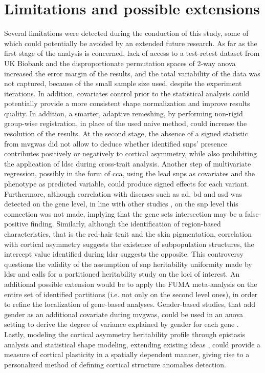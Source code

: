 \section{Limitations and possible extensions}
Several limitations were detected during the conduction of this study, some of which could potentially be avoided by an extended future research. As far as the first stage of the analysis is concerned, lack of access to a test-retest dataset from UK Biobank and the disproportionate permutation spaces of 2-way \ac{anova} increased the error margin of the results, and the total variability of the data was not captured, because of the small sample size used, despite the experiment iterations. In addition, covariates control prior to the statistical analysis could potentially provide a more consistent shape normalization and improve results quality. In addition, a smarter, adaptive remeshing, by performing non-rigid group-wise registration, in place of the used naive method, could increase the resolution of the results.
At the second stage, the absence of a signed statistic from \ac{mvgwas} did not allow to deduce whether identified \acp{snp}' presence contributes positively or negatively to cortical asymmetry, while also prohibiting the application of \ac{ldsc} during cross-trait analysis. Another step of multivariate regression, possibly in the form of \ac{cca}, using the lead \acp{snp} as covariates and the phenotype as predicted variable, could produce signed effects for each variant. Furthermore, although correlation with diseases such as \ac{ad}, \ac{bd} and \ac{asd} was detected on the gene level, in line with other studies \cite{Sha2021}, on the \ac{snp} level this connection was not made, implying that the gene sets intersection may be a false-positive finding. Similarly, although the identification of region-based characteristics, that is the red-hair trait and the skin pigmentation, correlation with cortical asymmetry suggests the existence of subpopulation structures, the intercept value identified during \ac{ldsr} suggests the opposite. This  controversy questions the validity of the assumption of \ac{snp} heritability uniformity made by \ac{ldsr} and calls for a partitioned heritability study on the loci of interest.
An additional possible extension would be to apply the FUMA meta-analysis on the entire set of identified partitions (i.e. not only on the second level ones), in order to refine the localization of gene-based analyses. Gender-based studies, that add gender as an additional covariate during  \ac{mvgwas}, could be used in an \ac{anova} setting to derive the degree of variance explained by gender for each gene \cite{Rawlik2016}. Lastly, modeling the cortical asymmetry heritability profile through epistasis analysis and statistical shape modeling, extending existing ideas \cite{Filipe2019,Claes2014,White2020}, could provide a measure of cortical plasticity in a spatially dependent manner, giving rise to a personalized method of defining cortical structure anomalies detection.



